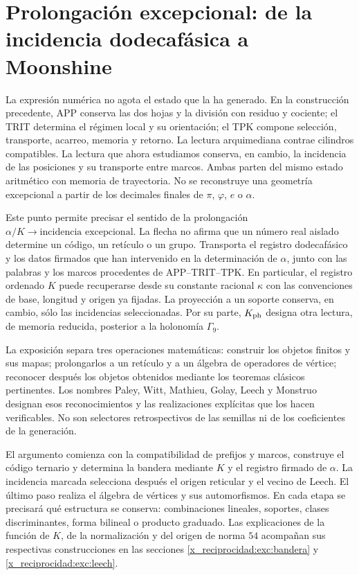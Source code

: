 \section{Prolongación excepcional: de la incidencia dodecafásica a Moonshine}
\label{x_reciprocidad:exc:seccion}

La expresión numérica no agota el estado que la ha generado. En la
construcción precedente, APP conserva las dos hojas y la división con
residuo y cociente; el TRIT determina el régimen local y su orientación;
el TPK compone selección, transporte, acarreo, memoria y retorno. La
lectura arquimediana contrae cilindros compatibles. La lectura que ahora
estudiamos conserva, en cambio, la incidencia de las posiciones y su
transporte entre marcos. Ambas parten del mismo estado aritmético con
memoria de trayectoria. No se
reconstruye una geometría excepcional a partir de los decimales finales
de $\pi$, $\varphi$, $e$ o $\alpha$.

Este punto permite precisar el sentido de la prolongación
$\alpha/K\longrightarrow\text{incidencia excepcional}$. La flecha no
afirma que un número real aislado determine un código, un retículo o un
grupo. Transporta el registro dodecafásico y los datos firmados que han
intervenido en la determinación de $\alpha$, junto con las palabras y los
marcos procedentes de APP--TRIT--TPK. En particular, el registro ordenado
$K$ puede recuperarse desde su constante racional $\kappa$ con las
convenciones de base, longitud y origen ya fijadas. La proyección a un
soporte conserva, en cambio, sólo las incidencias seleccionadas.
Por su parte, $K_{\rm ph}$
designa otra lectura, de memoria reducida, posterior a la holonomía
$\Gamma_9$.

La exposición separa tres operaciones matemáticas: construir los objetos
finitos y sus mapas; prolongarlos a un retículo y a un álgebra de operadores
de vértice; reconocer después los objetos obtenidos mediante los teoremas
clásicos pertinentes. Los nombres Paley, Witt, Mathieu, Golay, Leech y
Monstruo designan esos reconocimientos y las realizaciones explícitas
que los hacen verificables. No son selectores retrospectivos de las
semillas ni de los coeficientes de la generación.


El argumento comienza con la compatibilidad de prefijos y marcos,
construye el código ternario y determina la bandera mediante \(K\) y el
registro firmado de \(\alpha\). La incidencia marcada selecciona después
el origen reticular y el vecino de Leech. El último paso realiza el álgebra
de vértices y sus automorfismos. En cada etapa se precisará qué estructura
se conserva: combinaciones lineales, soportes, clases discriminantes, forma
bilineal o producto graduado. Las explicaciones de la función de \(K\),
de la normalización y del origen de norma \(54\) acompañan sus respectivas
construcciones en las secciones \ref{x_reciprocidad:exc:bandera} y \ref{x_reciprocidad:exc:leech}.


